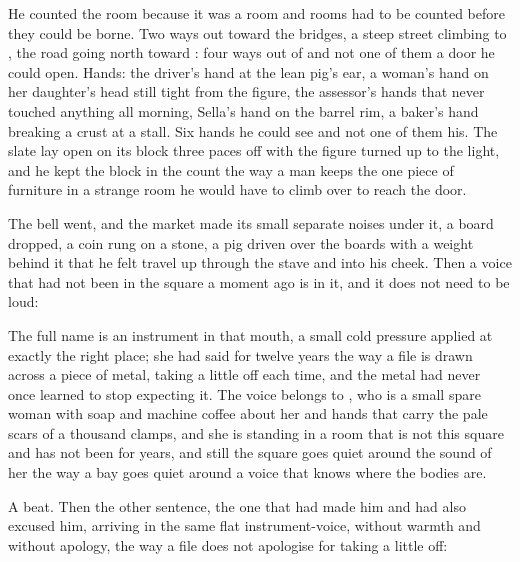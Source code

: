He counted the room because it was a room and rooms had to be counted before they could be borne. Two ways out toward the bridges, a steep street climbing to , the road going north toward : four ways out of  and not one of them a door he could open. Hands: the driver's hand at the lean pig's ear, a woman's hand on her daughter's head still tight from the figure, the assessor's hands that never touched anything all morning, Sella's hand on the barrel rim, a baker's hand breaking a crust at a stall. Six hands he could see and not one of them his. The slate lay open on its block three paces off with the figure turned up to the light, and he kept the block in the count the way a man keeps the one piece of furniture in a strange room he would have to climb over to reach the door.

The bell went, and the market made its small separate noises under it, a board dropped, a coin rung on a stone, a pig driven over the boards with a weight behind it that he felt travel up through the stave and into his cheek. Then a voice that had not been in the square a moment ago is in it, and it does not need to be loud: 

The full name is an instrument in that mouth, a small cold pressure applied at exactly the right place; she had said  for twelve years the way a file is drawn across a piece of metal, taking a little off each time, and the metal had never once learned to stop expecting it. The voice belongs to , who is a small spare woman with soap and machine coffee about her and hands that carry the pale scars of a thousand clamps, and she is standing in a room that is not this square and has not been for years, and still the square goes quiet around the sound of her the way a bay goes quiet around a voice that knows where the bodies are.

A beat. Then the other sentence, the one that had made him and had also excused him, arriving in the same flat instrument-voice, without warmth and without apology, the way a file does not apologise for taking a little off: 

